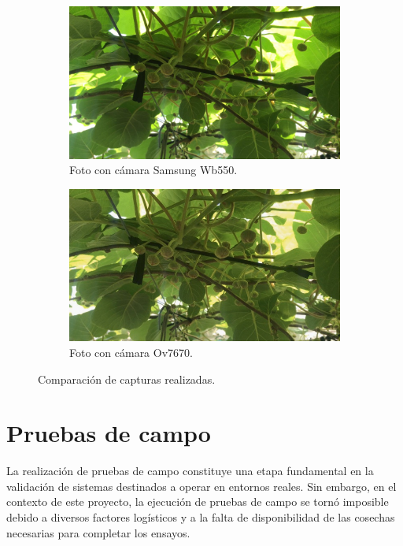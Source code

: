 \newpage

\begin{figure}[!htpb]
     \centering
     \begin{subfigure}[b]{1.0\textwidth}
         \centering
         \includegraphics[width=.80\textwidth]{./Figures/kiwi_samsung.jpg}
         \caption{Foto con cámara Samsung Wb550.}
         \label{fig:1de2}
     \end{subfigure}
     \hfill
     \begin{subfigure}[b]{1.0\textwidth}
         \centering
         \includegraphics[width=.80\textwidth]{./Figures/kiwi_Ov7670.jpg}
         \caption{Foto con cámara Ov7670.}
         \label{fig:2de2}
     \end{subfigure}
     \hfill

        \caption{Comparación de capturas realizadas.}
        \label{fig:comparacion_fotos}
\end{figure}

\section{Pruebas de campo}
\label{pruebas_de_campo}

La realización de pruebas de campo constituye una etapa fundamental en la validación de sistemas destinados a operar en entornos reales. Sin embargo, en el contexto de este proyecto, la ejecución de pruebas de campo se tornó imposible debido a diversos factores logísticos y a la falta de disponibilidad de las cosechas necesarias para completar los ensayos.

